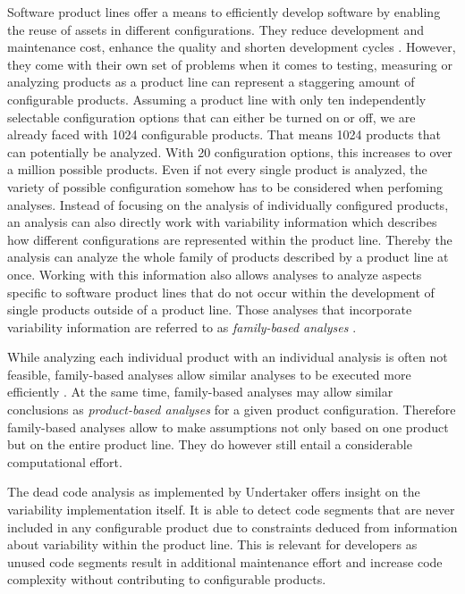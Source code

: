 \documentclass[a4paper]{article}
\begin{document}
Software product lines offer a means to efficiently develop software by enabling the reuse of assets in different configurations. They reduce development and maintenance cost, enhance the quality and shorten development cycles \cite{Pohl:2005:SPL:1095605} \cite{Apel:2013:FSP:2541773} \cite{spl-in-action}. However, they come with their own set of problems when it comes to testing, measuring or analyzing products as a product line can represent a staggering amount of configurable products. Assuming a product line with only ten independently selectable configuration options that can either be turned on or off, we are already faced with 1024 configurable products. That means 1024 products that can potentially be analyzed. With 20 configuration options, this increases to over a million possible products. Even if not every single product is analyzed, the variety of possible configuration somehow has to be considered when perfoming analyses. Instead of focusing on the analysis of individually configured products, an analysis can also directly work with variability information which describes how different configurations are represented within the product line. Thereby the analysis can analyze the whole family of products described by a product line at once. Working with this information also allows analyses to analyze aspects specific to software product lines that do not occur within the development of single products outside of a product line. Those analyses that incorporate variability information are referred to as \emph{family-based analyses} \cite{Thum:2014:CSA:2620784.2580950}.

While analyzing each individual product with an individual analysis is often not feasible, family-based analyses allow similar analyses to be executed more efficiently \cite{Thum:2014:CSA:2620784.2580950}. At the same time, family-based analyses may allow similar conclusions as \emph{product-based analyses} for a given product configuration. Therefore family-based analyses allow to make assumptions not only based on one product but on the entire product line. They do however still entail a considerable computational effort.

The dead code analysis as implemented by Undertaker \cite{Tartler:2011:FCC:1966445.1966451} offers insight on the variability implementation itself. It is able to detect code segments that are never included in any configurable product due to constraints deduced from information about variability within the product line. This is relevant for developers as unused code segments result in additional maintenance effort and increase code complexity without contributing to configurable products. 
\end{document}
